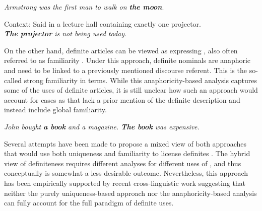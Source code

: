 \documentclass[output=paper,
modfonts
]{langscibook}
\begin{document}
\begin{exe}
\ex \label{ex:sereikaite:13}
\textit{Armstrong was the first man to walk on \textbf{the moon}}.  
\end{exe}

\begin{exe}
\ex \label{ex:sereikaite:14}
Context: Said in a lecture hall containing exactly one projector. \\
\textit{\textbf{The projector} is not being used today.} \citep[537]{Schwarz2013}
\end{exe}

On the other hand, definite articles can be viewed as expressing , also often referred to as familiarity \citep{Christophersen1939,Kamp1981,Heim1982}. Under this approach, definite nominals are anaphoric and need to be linked to a previously mentioned discourse referent. This is the so-called strong familiarity in  terms. While this anaphoricity-based analysis captures some of the uses of definite articles, it is still unclear how such an approach would account for cases as  that lack a prior mention of the definite description and instead include global familiarity.  

\begin{exe}
\ex \label{ex:sereikaite:15}
\textit{John bought \textbf{a book} and a magazine. \textbf{The book} was expensive.} \citep[537]{Schwarz2013}
\end{exe}

Several attempts have been made to propose a mixed view of both approaches that would use both uniqueness and familiarity to license definites \citep{Kadmon1990,Farkas2002,Roberts2003}. The hybrid view of definiteness requires different analyses for different uses of , and thus conceptually is somewhat a less desirable outcome. Nevertheless, this approach has been empirically supported by recent cross-linguistic work suggesting that neither the purely uniqueness-based approach nor the anaphoricity-based analysis can fully account for the full paradigm of definite uses.
\end{document}
